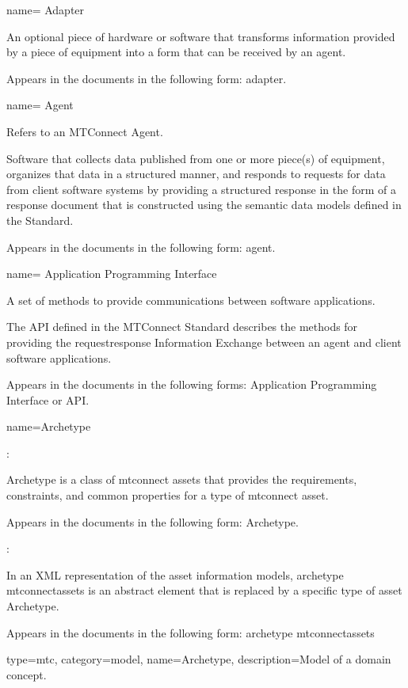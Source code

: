 {
  name= {Adapter}
}
{
  An optional piece of hardware or software that transforms information provided by a piece of equipment into a form that can be received by an \gls{agent}.

  Appears in the documents in the following form: adapter.
}


{
  name= {Agent}
}
{
  Refers to an MTConnect Agent. 
  
  Software that collects data published from one or more piece(s) of equipment, organizes that data in a structured manner, and responds to requests for data from client software systems by providing a structured response in the form of a \gls{response document} that is constructed using the \glspl{semantic data model} defined in the Standard. 
  
  Appears in the documents in the following form: \gls{agent}.
}


{
  name= {Application Programming Interface}
}
{
  A set of methods to provide communications between software applications.

  The API defined in the MTConnect Standard describes the methods for providing the \gls{requestresponse} Information Exchange between an \gls{agent} and client software applications.
  
  Appears in the documents in the following forms: Application Programming Interface or API.
}


{
  name={Archetype}
}
{
  :
  
  Archetype is a class of \glspl{mtconnect asset} that provides the requirements, constraints, and common properties for a type of \gls{mtconnect asset}.

  Appears in the documents in the following form: Archetype.

  :
  
  In an XML representation of the \glspl{asset information model}, \gls{archetype mtconnectassets} is an abstract element that is replaced by a specific type of \gls{asset} Archetype.
  
  Appears in the documents in the following form: \gls{archetype mtconnectassets}
}


{
  type=mtc,
  category=model,
  name={Archetype},
  description={Model of a domain concept.}
}

